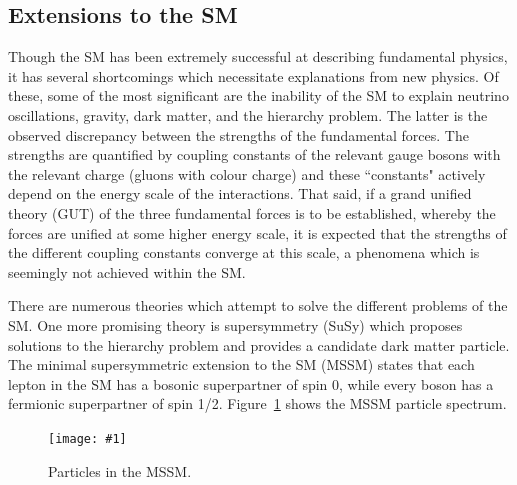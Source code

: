 \documentclass[twocolumn]{article}
\newcommand{\insertFigure}[1]{%
   \texttt{[image: \#1]}%
}
\begin{document}
\subsection{Extensions to the SM}
Though the SM has been extremely successful at describing fundamental physics, it has several shortcomings which necessitate explanations from new physics. Of these, some of the most significant are the inability of the SM to explain neutrino oscillations, gravity, dark matter, and the hierarchy problem. The latter is the observed discrepancy between the strengths of the fundamental forces. The strengths are quantified by coupling constants of the relevant gauge bosons with the relevant charge (gluons with colour charge) and these ``constants" actively depend on the energy scale of the interactions. That said, if a grand unified theory (GUT) of the three fundamental forces is to be established, whereby the forces are unified at some higher energy scale, it is expected that the strengths of the different coupling constants converge at this scale, a phenomena which is seemingly not achieved within the SM. \\
\par There are numerous theories which attempt to solve the different problems of the SM. One more promising theory is supersymmetry (SuSy) which proposes solutions to the hierarchy problem and provides a candidate dark matter particle. The minimal supersymmetric extension to the SM (MSSM) states that each lepton in the SM has a bosonic superpartner of spin 0, while every boson has a fermionic superpartner of spin 1/2. Figure~\ref{fig:susy} shows the MSSM particle spectrum.
\begin{figure}[!h]
	\centering
	\insertFigure{Images/susy.png}
	\caption{Particles in the MSSM.~\cite{susy}}
	\label{fig:susy}
\end{figure}
\end{document}
